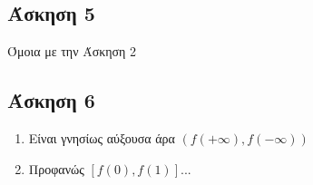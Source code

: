 \documentclass[greek]{beamer}
\begin{document}
\subsection{Άσκηση 5}
\begin{frame}[label=Λύση5]
      Όμοια με την Άσκηση 2

      \hyperlink{Άσκηση5}{}
\end{frame}

\subsection{Άσκηση 6}
\begin{frame}[label=Λύση6]
      \begin{enumerate}
            \item Είναι γνησίως αύξουσα άρα $(f(+\infty),f(-\infty))$
            \item Προφανώς $[f(0),f(1)]$...
      \end{enumerate}

      \hyperlink{Άσκηση6}{}
\end{frame}
\end{document}
